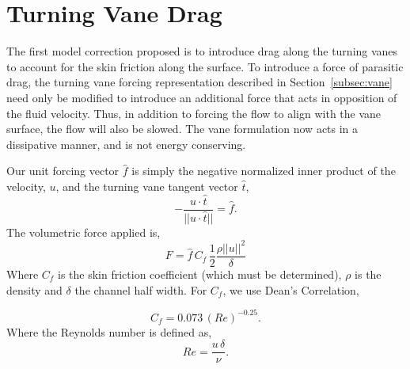 \section{Turning Vane Drag}

The first model correction proposed is to introduce drag along the
turning vanes to account for the skin friction along the surface. To
introduce a force of parasitic drag, the turning vane forcing 
representation described in Section~\ref{subsec:vane} need only be
modified to introduce an additional force that acts in opposition of the
fluid velocity. Thus, in addition to forcing the flow to align with the
vane surface, the flow will also be slowed. The vane formulation now
acts in a dissipative manner, and is not energy conserving. 

Our unit forcing vector $\hat f$ is simply the negative normalized inner
product of the velocity, $u$, and the turning vane tangent vector $\hat
t$,  
\begin{equation}
- \frac{u \cdot \hat t}{|| u \cdot \hat t ||} = \hat f. 
\end{equation}
The volumetric force applied is, 
\begin{equation}
 F = \hat f \, C_f \, \frac{1}{2} \frac{\rho || u ||^2}{\delta}
\end{equation}
Where $C_f$ is the skin friction coefficient (which must be determined),
$\rho $ is the density and $\delta$ the channel half width. 
For $C_f$, we use Dean's Correlation\cite{johnson1998handbook}, 

%
%
\begin{equation}
 C_f = 0.073 \, (Re)^{-0.25}. 
\end{equation}
Where the Reynolds number is defined as, 
\begin{equation}
 Re = \frac{u\, \delta}{\nu}.
\end{equation}

